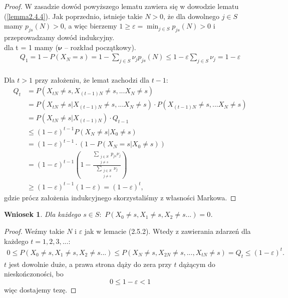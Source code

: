 \documentclass[a4paper]{article}
\theoremstyle{defn}
\theoremstyle{theorem}
\theoremstyle{lemma}
\theoremstyle{cor}
\newtheorem{cor}[defn]{Wniosek}
\theoremstyle{fact}
\begin{document}
\begin{proof}
W zasadzie dowód powyższego lematu zawiera się w dowodzie lematu (\ref{lemma2.4.4}). Jak poprzednio, istnieje takie $N > 0$, że dla dowolnego $j \in S$ mamy $p_{js}(N) > 0$, a więc bierzemy $1 \geq \varepsilon = \min_{j \in S} p_{js}(N) > 0$ i przeprowadzamy dowód indukcyjny.\\
dla t = 1 mamy ($\boldsymbol{\nu}$ – rozkład początkowy).\\
\begin{align*}
Q_1 = 1 - P(X_N = s) = 1 - \sum _{j \in S} \nu_jp_{js}(N) \leq 1 - \varepsilon \sum _{j \in S} \nu_j = 1 - \varepsilon
\end{align*}
\\
Dla $t > 1$ przy założeniu, że lemat zachodzi dla $t-1$:
\begin{align*}
Q_{t} &= P(X_{tN} \neq s, X_{(t-1)N} \neq s, ... X_N \neq s) \\
&= P(X_{tN} \neq s | X_{(t-1)N} \neq s, ... X_N \neq s) \cdot P(X_{(t-1)N} \neq s, ... X_N \neq s) \\
&= P(X_{tN} \neq s | X_{(t-1)N}) \cdot Q_{t-1}\\
&\leq (1- \varepsilon)^{t-1} P(X_N \neq s|X_0 \neq s) \\
&= (1- \varepsilon)^{t-1} \cdot (1 - P(X_N = s|X_0 \neq s)) \\
&= (1- \varepsilon)^{t-1} \left(1 - \frac{\sum_{\substack{j \in S\\j \neq s}} p_{js}\nu_j}{\sum_{\substack{j \in S\\j \neq s}} \nu_j}\right) \\
&\geq (1-\varepsilon)^{t-1} (1-\varepsilon) = (1-\varepsilon)^t,
\end{align*}
gdzie prócz założenia indukcyjnego skorzystaliśmy z własności Markowa.
\end{proof}
\begin{cor}\label{cor2.5.3}
Dla każdego $s \in S: \,\, P(X_0 \neq s, X_{1} \neq s, X_2 \neq s ...) = 0$.
\end{cor}
\begin{proof}
Weźmy takie $N$ i $\varepsilon$ jak w lemacie (2.5.2). Wtedy z zawierania zdarzeń dla każdego $t = 1,2,3,...$:
\begin{align*}
0 \leq P(X_0 \neq s, X_{1} \neq s, X_2 \neq s ...) \leq P(X_N \neq s, X_{2N} \neq s, ..., X_{tN} \neq s) = Q_t \leq (1-\varepsilon)^t.
\end{align*}
$t$ jest dowolnie duże, a prawa strona dąży do zera przy $t$ dążącym do nieskończoności, bo $$0 \leq 1 - \varepsilon < 1$$ więc dostajemy tezę.
\end{proof}
\end{document}
